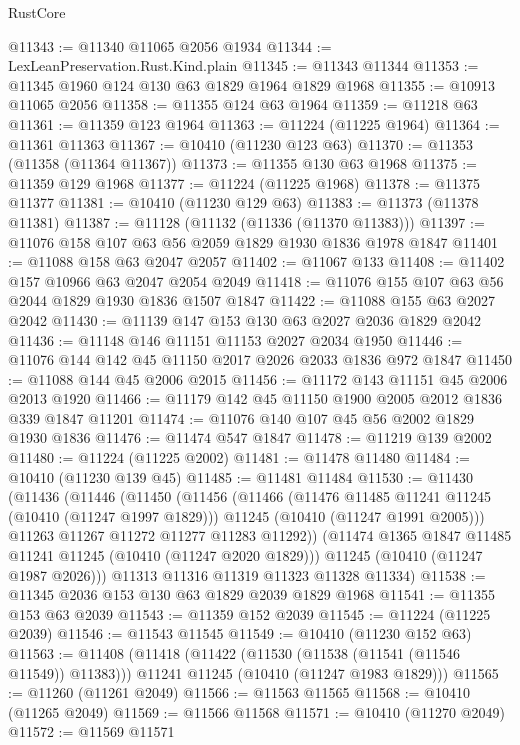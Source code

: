 \begin{lexlean}{RustCore}
\begin{coremodule}
@11343 := @11340 @11065 @2056 @1934
@11344 := LexLeanPreservation.Rust.Kind.plain
@11345 := @11343 @11344
@11353 := @11345 @1960 @124 @130 @63 @1829 @1964 @1829 @1968
@11355 := @10913 @11065 @2056
@11358 := @11355 @124 @63 @1964
@11359 := @11218 @63
@11361 := @11359 @123 @1964
@11363 := @11224 (@11225 @1964)
@11364 := @11361 @11363
@11367 := @10410 (@11230 @123 @63)
@11370 := @11353 (@11358 (@11364 @11367))
@11373 := @11355 @130 @63 @1968
@11375 := @11359 @129 @1968
@11377 := @11224 (@11225 @1968)
@11378 := @11375 @11377
@11381 := @10410 (@11230 @129 @63)
@11383 := @11373 (@11378 @11381)
@11387 := @11128 (@11132 (@11336 (@11370 @11383)))
@11397 := @11076 @158 @107 @63 @56 @2059 @1829 @1930 @1836 @1978 @1847
@11401 := @11088 @158 @63 @2047 @2057
@11402 := @11067 @133
@11408 := @11402 @157 @10966 @63 @2047 @2054 @2049
@11418 := @11076 @155 @107 @63 @56 @2044 @1829 @1930 @1836 @1507 @1847
@11422 := @11088 @155 @63 @2027 @2042
@11430 := @11139 @147 @153 @130 @63 @2027 @2036 @1829 @2042
@11436 := @11148 @146 @11151 @11153 @2027 @2034 @1950
@11446 := @11076 @144 @142 @45 @11150 @2017 @2026 @2033 @1836 @972 @1847
@11450 := @11088 @144 @45 @2006 @2015
@11456 := @11172 @143 @11151 @45 @2006 @2013 @1920
@11466 := @11179 @142 @45 @11150 @1900 @2005 @2012 @1836 @339 @1847 @11201
@11474 := @11076 @140 @107 @45 @56 @2002 @1829 @1930 @1836
@11476 := @11474 @547 @1847
@11478 := @11219 @139 @2002
@11480 := @11224 (@11225 @2002)
@11481 := @11478 @11480
@11484 := @10410 (@11230 @139 @45)
@11485 := @11481 @11484
@11530 := @11430
    (@11436
      (@11446
        (@11450
          (@11456
            (@11466
              (@11476 @11485 @11241 @11245 (@10410 (@11247 @1997 @1829)))
              @11245
              (@10410 (@11247 @1991 @2005)))
            @11263
            @11267
            @11272
            @11277
            @11283
            @11292))
        (@11474 @1365 @1847 @11485 @11241 @11245 (@10410 (@11247 @2020 @1829)))
        @11245
        (@10410 (@11247 @1987 @2026)))
      @11313
      @11316
      @11319
      @11323
      @11328
      @11334)
@11538 := @11345 @2036 @153 @130 @63 @1829 @2039 @1829 @1968
@11541 := @11355 @153 @63 @2039
@11543 := @11359 @152 @2039
@11545 := @11224 (@11225 @2039)
@11546 := @11543 @11545
@11549 := @10410 (@11230 @152 @63)
@11563 := @11408
    (@11418
      (@11422 (@11530 (@11538 (@11541 (@11546 @11549)) @11383)))
      @11241
      @11245
      (@10410 (@11247 @1983 @1829)))
@11565 := @11260 (@11261 @2049)
@11566 := @11563 @11565
@11568 := @10410 (@11265 @2049)
@11569 := @11566 @11568
@11571 := @10410 (@11270 @2049)
@11572 := @11569 @11571

\end{coremodule}
\end{lexlean}
